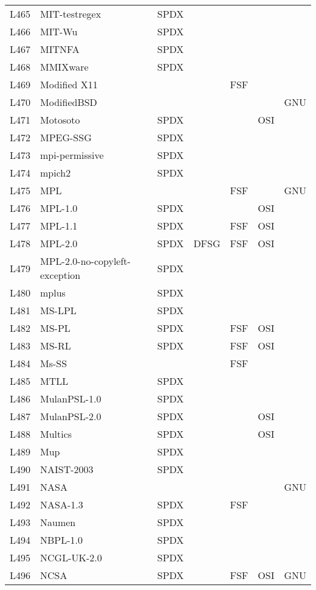 \begin{longtable}[h]{m{2cm} | m{7cm} | c | c | c | c | c}
  L465 & MIT-testregex & SPDX &  &  &  &  \\
  L466 & MIT-Wu & SPDX &  &  &  &  \\
  L467 & MITNFA & SPDX &  &  &  &  \\
  L468 & MMIXware & SPDX &  &  &  &  \\
  L469 & Modified X11 &  &  & FSF &  &  \\
  L470 & ModifiedBSD &  &  &  &  & GNU \\
  L471 & Motosoto & SPDX &  &  & OSI &  \\
  L472 & MPEG-SSG & SPDX &  &  &  &  \\
  L473 & mpi-permissive & SPDX &  &  &  &  \\
  L474 & mpich2 & SPDX &  &  &  &  \\
  L475 & MPL &  &  & FSF &  & GNU \\
  L476 & MPL-1.0 & SPDX &  &  & OSI &  \\
  L477 & MPL-1.1 & SPDX &  & FSF & OSI &  \\
  L478 & MPL-2.0 & SPDX & DFSG & FSF & OSI &  \\
  L479 & MPL-2.0-no-copyleft-exception & SPDX &  &  &  &  \\
  L480 & mplus & SPDX &  &  &  &  \\
  L481 & MS-LPL & SPDX &  &  &  &  \\
  L482 & MS-PL & SPDX &  & FSF & OSI &  \\
  L483 & MS-RL & SPDX &  & FSF & OSI &  \\
  L484 & Ms-SS &  &  & FSF &  &  \\
  L485 & MTLL & SPDX &  &  &  &  \\
  L486 & MulanPSL-1.0 & SPDX &  &  &  &  \\
  L487 & MulanPSL-2.0 & SPDX &  &  & OSI &  \\
  L488 & Multics & SPDX &  &  & OSI &  \\
  L489 & Mup & SPDX &  &  &  &  \\
  L490 & NAIST-2003 & SPDX &  &  &  &  \\
  L491 & NASA &  &  &  &  & GNU \\
  L492 & NASA-1.3 & SPDX &  & FSF &  &  \\
  L493 & Naumen & SPDX &  &  &  &  \\
  L494 & NBPL-1.0 & SPDX &  &  &  &  \\
  L495 & NCGL-UK-2.0 & SPDX &  &  &  &  \\
  L496 & NCSA & SPDX &  & FSF & OSI & GNU \\

\end{longtable}
